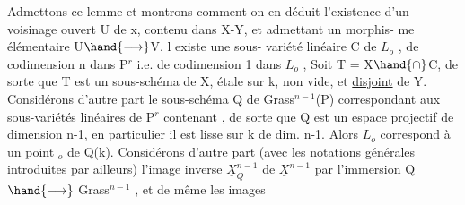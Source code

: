 Admettons  ce lemme  et montrons comment on en déduit  l'existence
d'un voisinage ouvert U de x, contenu dans X-Y, et admettant un morphis-%
me élémentaire U$\hand{\longrightarrow}$V.  
 l existe une sous-%
variété linéaire C de $L_o$ , de codimension n dans P$^r$ i.e. de codimension
1 dans $L_o$ ,  
   
 Soit  T = X$\hand{\cap}$C, de sorte que T est un sous-schéma de X,
étale sur k, non vide, et \uline{disjoint} de Y.  Considérons d'autre part le
sous-schéma Q de Grass$^{n-1}$(P) correspondant aux sous-variétés linéaires
de P$^r$ contenant , de sorte que  Q est un  espace projectif
de dimension n-1,   en particulier il est lisse sur k de dim. n-1.
Alors $L_o$ correspond à un point \hand{$\xi$}$_o$ de Q(k).  Considérons d'autre part
(avec les notations générales introduites par ailleurs)  l'image inverse
$\underline{X}^{n-1}_Q$ de $\underline{X}^{n-1}$  par  l'immersion Q$\hand{\longrightarrow}$ Grass$^{n-1}$ , et de même les images

